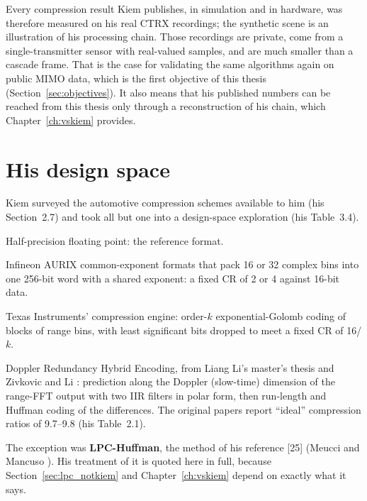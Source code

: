 Every compression result Kiem publishes, in simulation and in hardware, was
therefore measured on his real CTRX recordings; the synthetic scene is an
illustration of his processing chain. Those recordings are private, come from a
single-transmitter sensor with real-valued samples, and are much smaller than a
cascade frame. That is the case for validating the same algorithms again on
public MIMO data, which is the first objective of this thesis
(Section~\ref{sec:objectives}). It also means that his published numbers can be
reached from this thesis only through a reconstruction of his chain, which
Chapter~\ref{ch:vskiem} provides.

\section{His design space}
\label{sec:kc_space}

Kiem surveyed the automotive compression schemes available to him (his
Section~2.7) and took all but one into a design-space exploration (his
Table~3.4).

\begin{description}[leftmargin=!,labelwidth=24mm,style=nextline,font=\normalfont\bfseries]
\item[FP16] Half-precision floating point: the reference format.
\item[CMPRA, CMPRB] Infineon AURIX common-exponent formats that pack 16 or 32
complex bins into one 256-bit word with a shared exponent: a fixed CR of 2 or 4
against 16-bit data.
\item[EGE10 \ldots EGE4] Texas Instruments' compression engine: order-$k$
exponential-Golomb coding of blocks of range bins, with least significant bits
dropped to meet a fixed CR of 16/$k$.
\item[DRHE] Doppler Redundancy Hybrid Encoding, from Liang Li's master's thesis
\cite{li2014} and Zivkovic and Li \cite{zivkovic2015}: prediction along the
Doppler (slow-time) dimension of the range-FFT output with two IIR filters in
polar form, then run-length and Huffman coding of the differences. The
original papers report ``ideal'' compression ratios of 9.7--9.8 (his
Table~2.1).
\end{description}

\noindent
The exception was \textbf{LPC-Huffman}, the method of his reference [25]
(Meucci and Mancuso \cite{meucci2022}). His treatment of it is quoted here in
full, because Section~\ref{sec:lpc_notkiem} and Chapter~\ref{ch:vskiem} depend
on exactly what it says.

